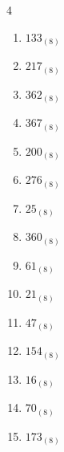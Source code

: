 \begin{multicols}{4}
\begin{enumerate}
        \phantom{$=106$}

  \item $133_{(8)}$

        \phantom{$=91$}

  \item $217_{(8)}$

        \phantom{$=143$}

  \item $362_{(8)}$

        \phantom{$=242$}

  \item $367_{(8)}$

        \phantom{$=247$}

  \item $200_{(8)}$

        \phantom{$=128$}

  \item $276_{(8)}$

        \phantom{$=190$}

\columnbreak %

  \item $25_{(8)}$

        \phantom{$=21$}

  \item $360_{(8)}$

        \phantom{$=240$}

  \item $61_{(8)}$

        \phantom{$=49$}

  \item $21_{(8)}$

        \phantom{$=17$}

  \item $47_{(8)}$

        \phantom{$=39$}

  \item $154_{(8)}$

        \phantom{$=108$}

  \item $16_{(8)}$

        \phantom{$=14$}

  \item $70_{(8)}$

        \phantom{$=56$}

  \item $173_{(8)}$

        \phantom{$=123$}


\end{enumerate}
\end{multicols}
